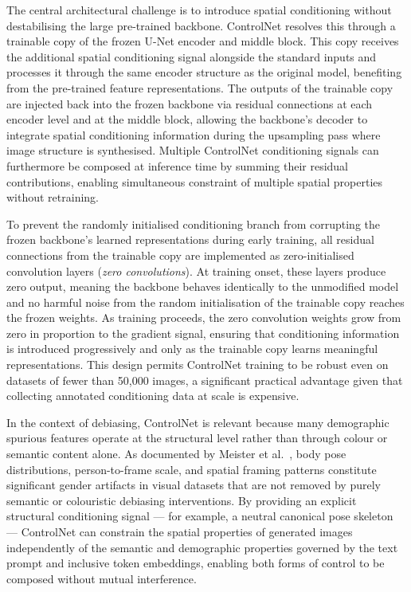 The central architectural challenge is to introduce spatial 
conditioning without destabilising the large pre-trained backbone. 
ControlNet resolves this through a trainable copy of the frozen 
U-Net encoder and middle block. This copy receives the additional 
spatial conditioning signal alongside the standard inputs and 
processes it through the same encoder structure as the original 
model, benefiting from the pre-trained feature representations. The 
outputs of the trainable copy are injected back into the frozen 
backbone via residual connections at each encoder level and at the 
middle block, allowing the backbone's decoder to integrate spatial 
conditioning information during the upsampling pass where image 
structure is synthesised. Multiple ControlNet conditioning signals 
can furthermore be composed at inference time by summing their 
residual contributions, enabling simultaneous constraint of multiple 
spatial properties without retraining.

To prevent the randomly initialised conditioning branch from 
corrupting the frozen backbone's learned representations during 
early training, all residual connections from the trainable copy 
are implemented as zero-initialised convolution layers 
(\textit{zero convolutions}). At training onset, these layers 
produce zero output, meaning the backbone behaves identically to 
the unmodified model and no harmful noise from the random 
initialisation of the trainable copy reaches the frozen weights. 
As training proceeds, the zero convolution weights grow from zero 
in proportion to the gradient signal, ensuring that conditioning 
information is introduced progressively and only as the trainable 
copy learns meaningful representations. This design permits 
ControlNet training to be robust even on datasets of fewer than 
50,000 images, a significant practical advantage given that 
collecting annotated conditioning data at scale is expensive.

In the context of debiasing, ControlNet is relevant because many 
demographic spurious features operate at the structural level 
rather than through colour or semantic content alone. As documented 
by Meister et al.\ \cite{Meister_2023_GenderArtifactsinVisualDatasets}, body pose 
distributions, person-to-frame scale, and spatial framing patterns 
constitute significant gender artifacts in visual datasets that are 
not removed by purely semantic or colouristic debiasing 
interventions. By providing an explicit structural conditioning 
signal — for example, a neutral canonical pose skeleton — ControlNet 
can constrain the spatial properties of generated images 
independently of the semantic and demographic properties governed 
by the text prompt and inclusive token embeddings, enabling both 
forms of control to be composed without mutual interference.

